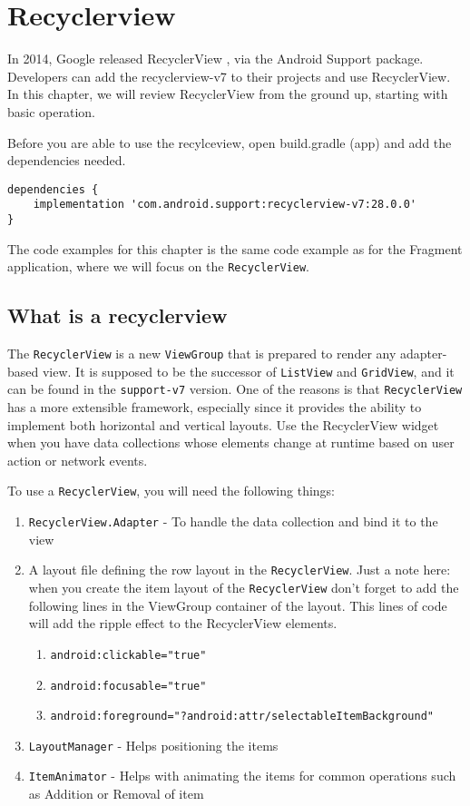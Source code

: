 \chapter{Recyclerview}
In 2014, Google released RecyclerView , via the Android Support package. Developers can add the recyclerview-v7 to their projects and use RecyclerView. In this chapter, we will review RecyclerView from the ground up, starting with basic
operation.

Before you are able to use the recylceview,  open build.gradle (app) and add the dependencies needed.


\begin{lstlisting}
dependencies {
	implementation 'com.android.support:recyclerview-v7:28.0.0'
}
\end{lstlisting}


\begin{example}
	The code examples for this chapter is the same code example as for the Fragment application, where we will focus on the  \lstinline!RecyclerView!.
\end{example}

\section{What is a recyclerview}
The \lstinline!RecyclerView! is a new \lstinline!ViewGroup! that is prepared to render any adapter-based view. It is supposed to be the successor of \lstinline!ListView! and \lstinline!GridView!, and it can be found in the \lstinline!support-v7! version. One of the reasons is that \lstinline!RecyclerView! has a more extensible framework, especially since it provides the ability to implement both horizontal and vertical layouts. Use the RecyclerView widget when you have data collections whose elements change at runtime based on user action or network events.

To use a \lstinline!RecyclerView!, you will need the following things:
\begin{enumerate}
	\item \lstinline!RecyclerView.Adapter! - To handle the data collection and bind it to the view
	\item A layout file defining the row layout in the \lstinline!RecyclerView!. Just a note here: when you create the item layout of the \lstinline!RecyclerView! don’t forget to add the following lines in the ViewGroup container of the layout. This lines of code will add the ripple effect to the RecyclerView elements.
	\begin{enumerate}
		\item  \lstinline!android:clickable="true"!
		\item \lstinline!android:focusable="true"!
		\item \lstinline!android:foreground="?android:attr/selectableItemBackground"!
	\end{enumerate}
	\item \lstinline!LayoutManager! - Helps positioning the items
	\item \lstinline!ItemAnimator! - Helps with animating the items for common operations such as Addition or Removal of item
\end{enumerate}


